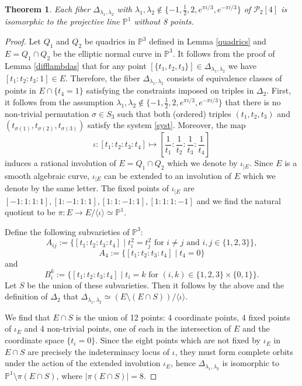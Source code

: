 \documentclass{article}
\newtheorem{thm}{Theorem}[section]
\numberwithin{equation}{section}
\begin{document}
\begin{thm}
\label{discr}
    Each fiber $\Delta_{\lambda_1,\lambda_2}$ with $\lambda_1, \lambda_2 \notin \{-1, \frac12, 2, e^{\pi i /3}, e^{-\pi i /3}\}$ of $\mathcal{P}_2[4]$ is isomorphic to the projective line $\mathbb{P}^1$ without 8 points.
\end{thm}

\begin{proof}

    Let $Q_1$ and $Q_2$ be quadrics in $\mathbb{P}^3$ defined in Lemma \ref{quadrics} and $E = Q_1 \cap Q_2$ be the elliptic normal curve in $\mathbb{P}^3$. It follows from the proof of Lemma \ref{difflambdas} that for any point $[\{t_1, t_2, t_3\}] \in \Delta_{\lambda_1, \lambda_2}$ we have $[t_1:t_2:t_3:1] \in E$. Therefore, the fiber $\Delta_{\lambda_1, \lambda_2}$ consists of equivalence classes of points in $E \cap \{t_4 = 1\}$ satisfying the constraints imposed on triples in $\Delta_2$. First, it follows from the assumption $\lambda_1, \lambda_2 \notin \{-1, \frac12, 2, e^{\pi i /3}, e^{-\pi i /3}\}$ that there is no non-trivial permutation $\sigma \in S_3$ such that both (ordered) triples $(t_1,t_2,t_3)$ and $(t_{\sigma(1)},t_{\sigma(2)}, t_{\sigma(3)})$ satisfy the system \ref{syst}. Moreover, the map $$\iota: [t_1:t_2:t_3:t_4] \mapsto \left[\frac{1}{t_1}:\frac{1}{t_2}: \frac{1}{t_3}: \frac{1}{t_4}\right]$$ induces a rational involution of $E = Q_1 \cap Q_2$ which we denote by $\iota_{|E}$. Since $E$ is a smooth algebraic curve, $\iota_{|E}$ can be extended to an involution of $E$ which we denote by the same letter. The fixed points of $\iota_{|E}$ are $[-1:1:1:1], [1:-1:1:1], [1:1:-1:1], [1:1:1:-1]$ and we find the natural quotient to be $\pi: E \to E/\langle\iota\rangle \simeq \mathbb{P}^1$. 
    
    Define the following subvarieties of $\mathbb{P}^3$: $$A_{ij} := \{[t_1:t_2:t_3:t_4] \mid t_i^2 = t_j^2 \text{ for } i\neq j \text{ and } i,j\in\{1,2,3\}\},$$ $$A_4 := \{[t_1:t_2:t_3:t_4] \mid t_4 = 0\}$$ and $$B_{i}^k := \{[t_1:t_2:t_3:t_4] \mid t_i = k \text{ for }(i,k) \in \{1,2,3\} \times \{0,1\}\}.$$ 
    Let $S$ be the union of these subvarieties. Then it follows by the above and the definition of $\Delta_2$ that $\Delta_{\lambda_1, \lambda_2} \simeq (E \setminus (E \cap S))/\langle\iota\rangle$. 
    
    We find that $E \cap S$ is the union of 12 points: 4 coordinate points, 4 fixed points of $\iota_E$ and 4 non-trivial points, one of each in the intersection of $E$ and the coordinate space $\{t_i = 0\}$. Since the eight points which are not fixed by $\iota_E$ in $E \cap S$ are precisely the indeterminacy locus of $\iota$, they must form complete orbits under the action of the extended involution $\iota_E$, hence $\Delta_{\lambda_1, \lambda_2}$ is isomorphic to $\mathbb{P}^1 \setminus \pi(E \cap S)$, where $|\pi(E \cap S)| = 8$.
    

\end{proof}
\end{document}
